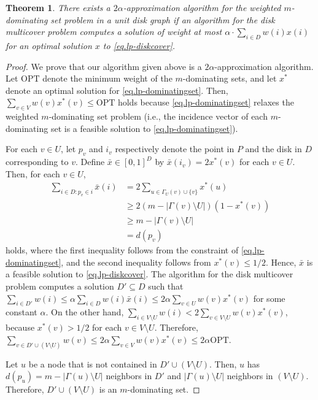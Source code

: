 \documentclass[11pt]{article}
\newcommand{\opt}{\mathrm{OPT}}
\newtheorem{theorem}{Theorem}
\begin{document}
\begin{theorem}
 There exists a $2\alpha$-approximation algorithm for the weighted $m$-dominating set problem in a
 unit disk graph if an algorithm for the disk multicover problem
 computes a solution of weight at most
 $\alpha \cdot \sum_{i \in D} w(i)x(i)$ for an optimal solution $x$ to
 \eqref{eq.lp-diskcover}.
\end{theorem}
\begin{proof}
 We prove that our algorithm given above is a $2\alpha$-approximation algorithm.
 Let $\opt$ denote the minimum weight of the $m$-dominating sets,
 and let $x^*$ denote an optimal solution for \eqref{eq.lp-dominatingset}. Then,
 $\sum_{v \in V}w(v)x^*(v) \leq \opt$ holds
 because
 \eqref{eq.lp-dominatingset} relaxes 
  the weighted $m$-dominating set problem 
 (i.e., the incidence vector of each $m$-dominating set is a feasible solution to
 \eqref{eq.lp-dominatingset}).

For each $v\in U$, let $p_v$ and $i_v$ respectively denote the point in $P$ and the
 disk in $D$ corresponding to $v$.
 Define $\bar{x} \in [0,1]^{D}$ by $\bar{x}(i_v)=2x^*(v)$ for each $v \in
 U$.
 Then, for each $v \in U$,
 \begin{align*}
 \sum_{i \in D: p_v\in i}\bar{x}(i)
  &= 2 \sum_{u \in \Gamma_U(v) \cup \{v\}}x^*(u)\\
  &\geq 2 (m-|\Gamma(v)\setminus U|)(1-x^*(v))\\
  &\geq m-|\Gamma(v)\setminus U|\\
  &=d(p_v)
 \end{align*}
 holds, where the first inequality follows from the constraint
 of \eqref{eq.lp-dominatingset}, and the second inequality follows from
 $x^*(v) \leq 1/2$.
Hence, $\bar{x}$ is a feasible solution to \eqref{eq.lp-diskcover}.
 The algorithm for the disk multicover problem computes a solution $D'
 \subseteq D$ such that $\sum_{i \in D'}w(i) \leq \alpha \sum_{i \in D}w(i)\bar{x}(i)
 \leq 2\alpha\sum_{v \in U}w(v)x^*(v)$ for some constant $\alpha$.
 On the other hand, $\sum_{i \in V \setminus U}w(i) <
 2\sum_{v \in V\setminus U}w(v)x^*(v)$, because $x^*(v) > 1/2$ for
 each $v \in V\setminus U$.
 Therefore, $\sum_{v \in D' \cup (V\setminus U)}w(v)
 \leq 2 \alpha\sum_{v \in V}w(v)x^*(v) \leq 2\alpha \opt$.

 Let $u$ be a node that is not contained in $D' \cup (V\setminus U)$.
 Then, $u$ has $d(p_u)=m-|\Gamma(u)\setminus U|$ neighbors in $D'$
 and $|\Gamma(u)\setminus U|$ neighbors in $(V\setminus U)$.
 Therefore, $D' \cup (V\setminus U)$ is an $m$-dominating set.
 \end{proof}
\end{document}
